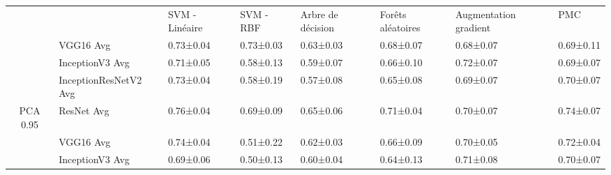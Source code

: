 
\begin{landscape}
\begin{table}[]
\begin{tabular}{clllllll}
\multicolumn{1}{l}{}        &                                    & SVM - Linéaire                             & SVM - RBF                         & Arbre de décision                 & Forêts aléatoires                 & Augmentation gradient             & PMC                               \\
                            & VGG16 Avg                          & 0.73±0.04                                  & 0.73±0.03                         & 0.63±0.03                         & 0.68±0.07                         & 0.68±0.07                         & 0.69±0.11                         \\
                            & InceptionV3 Avg                    & 0.71±0.05                                  & 0.58±0.13                         & 0.59±0.07                         & 0.66±0.10                         & 0.72±0.07                         & 0.69±0.07                         \\
                            & InceptionResNetV2 Avg              & 0.73±0.04                                  & 0.58±0.19                         & 0.57±0.08                         & 0.65±0.08                         & 0.69±0.07                         & 0.70±0.07                         \\
\multirow{-4}{*}{PCA 0.95}  & ResNet Avg                         & 0.76±0.04                                  & 0.69±0.09                         & 0.65±0.06                         & 0.71±0.04                         & 0.70±0.07                         & 0.74±0.07                         \\
                            & VGG16 Avg                          & 0.74±0.04                                  & 0.51±0.22                         & 0.62±0.03                         & 0.66±0.09                         & 0.70±0.05                         & 0.72±0.04                         \\
                            & InceptionV3 Avg                    & 0.69±0.06                                  & 0.50±0.13                         & 0.60±0.04                         & 0.64±0.13                         & 0.71±0.08                         & 0.70±0.07                         \\

\end{tabular}
\end{table}
\end{landscape}
